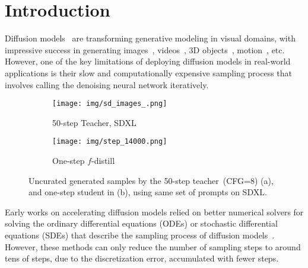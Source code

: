 \section{Introduction}
\label{sec:intro}

Diffusion models~\cite{ho2020ddpm, song2020score} are transforming generative modeling in visual domains, with impressive success in generating images~\cite{rombach2022high,saharia2022photorealistic, balaji2022ediffi}, videos~\cite{ho2022video, singer2023makeavideo}, 3D objects~\cite{luo2021diffusion, zeng2022lion}, motion~\cite{zhang2022motiondiffuse, yuan2023physdiff}, etc. However, one of the key limitations of deploying diffusion models in real-world applications is their slow and computationally expensive sampling process that involves calling the denoising neural network iteratively.
\begin{figure}[t]
    \centering
  \begin{subfigure}[b]{0.48\textwidth}
    \texttt{[image: img/sd\_images\_.png]}
        \vspace{-12pt}
    \caption{50-step Teacher, SDXL}
  \end{subfigure}
 \hfill
    \begin{subfigure}[b]{0.48\textwidth}
    \texttt{[image: img/step\_14000.png]}
    \vspace{-12pt}
    \caption{One-step $f$-distill}
  \end{subfigure}
    \caption{Uncurated generated samples by the 50-step teacher~(CFG=8) (a), and one-step student in \methodtext (b), using same set of prompts on SDXL.}
    \label{fig:vis-main}
    \vspace{-12pt}
\end{figure}
Early works on accelerating diffusion models relied on better numerical solvers for solving the ordinary differential equations (ODEs) or stochastic differential equations (SDEs) that describe the sampling process of diffusion models~\cite{Song2020DenoisingDI, JolicoeurMartineau2021GottaGF, lu2022dpm, Karras2022ElucidatingTD, Xu2023RestartSF}. However, these methods can only reduce the number of sampling steps to around tens of steps, due to the discretization error, accumulated with fewer steps.

